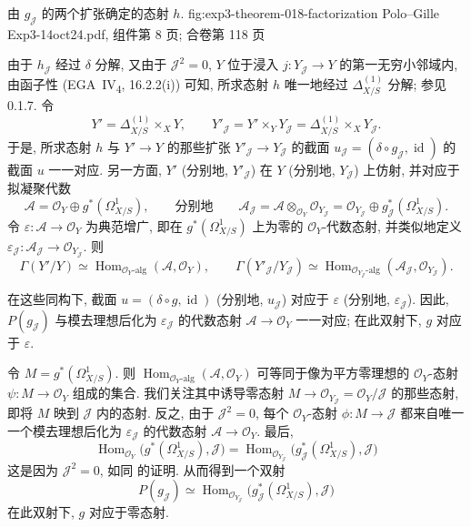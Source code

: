   {由 \(g_{\mathscr J}\) 的两个扩张确定的态射 \(h\).}
  {fig:exp3-theorem-018-factorization}
  {Polo--Gille Exp3-14oct24.pdf, 组件第 8 页; 合卷第 118 页}

由于 \(h_{\mathscr J}\) 经过 \(\delta\) 分解, 又由于
\(\mathscr J^2=0\), \(Y\) 位于浸入 \(j:Y_{\mathscr J}\to Y\)
的第一无穷小邻域内, 由函子性 (EGA~IV\textsubscript{4}, 16.2.2(i))
可知, 所求态射 \(h\) 唯一地经过 \(\Delta^{(1)}_{X/S}\) 分解;
参见 0.1.7. 令
\[
 Y'=\Delta^{(1)}_{X/S}\times_XY,
 \qquad
 Y'_{\mathscr J}=Y'\times_YY_{\mathscr J}
 =\Delta^{(1)}_{X/S}\times_XY_{\mathscr J}.
\]
于是, 所求态射 \(h\) 与 \(Y'\to Y\) 的那些扩张
\(Y'_{\mathscr J}\to Y_{\mathscr J}\) 的截面
\(u_{\mathscr J}=(\delta\circ g_{\mathscr J},\operatorname{id})\)
的截面 \(u\) 一一对应. 另一方面, \(Y'\) (分别地,
\(Y'_{\mathscr J}\)) 在 \(Y\) (分别地, \(Y_{\mathscr J}\)) 上仿射,
并对应于拟凝聚代数
\[
 \mathscr A=\mathscr O_Y\oplus g^*(\Omega^1_{X/S}),
 \qquad\text{分别地}\qquad
 \mathscr A_{\mathscr J}
 =\mathscr A\otimes_{\mathscr O_Y}\mathscr O_{Y_{\mathscr J}}
 =\mathscr O_{Y_{\mathscr J}}
   \oplus g_{\mathscr J}^*(\Omega^1_{X/S}).
\]
令 \(\varepsilon:\mathscr A\to\mathscr O_Y\) 为典范增广,
即在 \(g^*(\Omega^1_{X/S})\) 上为零的 \(\mathscr O_Y\)-代数态射,
并类似地定义 \(\varepsilon_{\mathscr J}:\mathscr A_{\mathscr J}
 \to\mathscr O_{Y_{\mathscr J}}\). 则
\[
 \Gamma(Y'/Y)
 \simeq\operatorname{Hom}_{\mathscr O_Y\text{-}\mathrm{alg}}
       (\mathscr A,\mathscr O_Y),
 \qquad
 \Gamma(Y'_{\mathscr J}/Y_{\mathscr J})
 \simeq
 \operatorname{Hom}_{\mathscr O_{Y_{\mathscr J}}\text{-}\mathrm{alg}}
       (\mathscr A_{\mathscr J},\mathscr O_{Y_{\mathscr J}}).
\]

在这些同构下, 截面 \(u=(\delta\circ g,\operatorname{id})\)
(分别地, \(u_{\mathscr J}\)) 对应于 \(\varepsilon\)
(分别地, \(\varepsilon_{\mathscr J}\)). 因此, \(P(g_{\mathscr J})\)
与模去理想后化为 \(\varepsilon_{\mathscr J}\) 的代数态射
\(\mathscr A\to\mathscr O_Y\) 一一对应; 在此双射下,
\(g\) 对应于 \(\varepsilon\).

令 \(M=g^*(\Omega^1_{X/S})\). 则
\(\operatorname{Hom}_{\mathscr O_Y\text{-}\mathrm{alg}}
 (\mathscr A,\mathscr O_Y)\) 可等同于像为平方零理想的
\(\mathscr O_Y\)-态射 \(\psi:M\to\mathscr O_Y\) 组成的集合.
我们关注其中诱导零态射
\(M\to\mathscr O_{Y_{\mathscr J}}=\mathscr O_Y/\mathscr J\)
的那些态射, 即将 \(M\) 映到 \(\mathscr J\) 内的态射.
反之, 由于 \(\mathscr J^2=0\), 每个 \(\mathscr O_Y\)-态射
\(\phi:M\to\mathscr J\) 都来自唯一一个模去理想后化为
\(\varepsilon_{\mathscr J}\) 的代数态射 \(\mathscr A\to\mathscr O_Y\).
最后,
\[
 \operatorname{Hom}_{\mathscr O_Y}
   \bigl(g^*(\Omega^1_{X/S}),\mathscr J\bigr)
 =
 \operatorname{Hom}_{\mathscr O_{Y_{\mathscr J}}}
   \bigl(g_{\mathscr J}^*(\Omega^1_{X/S}),\mathscr J\bigr)
\]
这是因为 \(\mathscr J^2=0\), 如同
 的证明.
从而得到一个双射
\[
 P(g_{\mathscr J})\simeq
 \operatorname{Hom}_{\mathscr O_{Y_{\mathscr J}}}
 \bigl(g_{\mathscr J}^*(\Omega^1_{X/S}),\mathscr J\bigr)
\]
在此双射下, \(g\) 对应于零态射.

